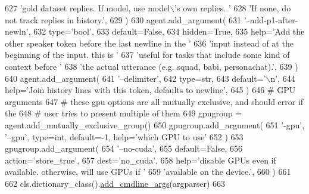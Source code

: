 \begin{DoxyCode}
627             \textcolor{stringliteral}{'gold dataset replies. If model, use model\(\backslash\)'s own replies. '}
628             \textcolor{stringliteral}{'If none, do not track replies in history.'},
629         )
630         agent.add\_argument(
631             \textcolor{stringliteral}{'--add-p1-after-newln'},
632             type=\textcolor{stringliteral}{'bool'},
633             default=\textcolor{keyword}{False},
634             hidden=\textcolor{keyword}{True},
635             help=\textcolor{stringliteral}{'Add the other speaker token before the last newline in the '}
636             \textcolor{stringliteral}{'input instead of at the beginning of the input. this is '}
637             \textcolor{stringliteral}{'useful for tasks that include some kind of context before '}
638             \textcolor{stringliteral}{'the actual utterance (e.g. squad, babi, personachat).'},
639         )
640         agent.add\_argument(
641             \textcolor{stringliteral}{'--delimiter'},
642             type=str,
643             default=\textcolor{stringliteral}{'\(\backslash\)n'},
644             help=\textcolor{stringliteral}{'Join history lines with this token, defaults to newline'},
645         )
646         \textcolor{comment}{# GPU arguments}
647         \textcolor{comment}{# these gpu options are all mutually exclusive, and should error if the}
648         \textcolor{comment}{# user tries to present multiple of them}
649         gpugroup = agent.add\_mutually\_exclusive\_group()
650         gpugroup.add\_argument(
651             \textcolor{stringliteral}{'-gpu'}, \textcolor{stringliteral}{'--gpu'}, type=int, default=-1, help=\textcolor{stringliteral}{'which GPU to use'}
652         )
653         gpugroup.add\_argument(
654             \textcolor{stringliteral}{'--no-cuda'},
655             default=\textcolor{keyword}{False},
656             action=\textcolor{stringliteral}{'store\_true'},
657             dest=\textcolor{stringliteral}{'no\_cuda'},
658             help=\textcolor{stringliteral}{'disable GPUs even if available. otherwise, will use GPUs if '}
659             \textcolor{stringliteral}{'available on the device.'},
660         )
661 
662         cls.dictionary\_class().\hyperlink{namespaceparlai_1_1agents_1_1drqa_1_1config_a62fdd5554f1da6be0cba185271058320}{add\_cmdline\_args}(argparser)
663 
\end{DoxyCode}
\mbox{\label{classparlai_1_1core_1_1torch__agent_1_1TorchAgent_a8df662b1258ec67752b4fc0ad45733f9}} 

